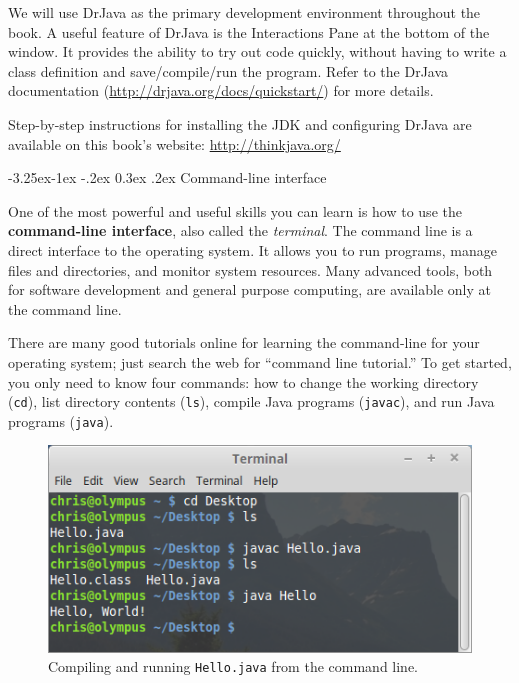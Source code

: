 \documentclass[12pt]{book}
\makeatletter
\theoremstyle{exercise}
\renewcommand\subsection{\@startsection{subsection}{2}{\z@}%
    {-3.25ex\@plus -1ex \@minus -.2ex}%
    {0.3ex \@plus .2ex}%
    {\normalfont\large\bfseries}}
\makeatother
\begin{document}

We will use DrJava as the primary development environment throughout the book.
A useful feature of DrJava is the Interactions Pane at the bottom of the window.
It provides the ability to try out code quickly, without having to write a class definition and save/compile/run the program.
Refer to the DrJava documentation (\url{http://drjava.org/docs/quickstart/}) for more details.

Step-by-step instructions for installing the JDK and configuring DrJava are available on this book's website: \url{http://thinkjava.org/}


\subsection{Command-line interface}


One of the most powerful and useful skills you can learn is how to use the {\bf command-line interface}, also called the {\em terminal}.
The command line is a direct interface to the operating system.
It allows you to run programs, manage files and directories, and monitor system resources.
Many advanced tools, both for software development and general purpose computing, are available only at the command line.

There are many good tutorials online for learning the command-line for your operating system; just search the web for ``command line tutorial.''
To get started, you only need to know four commands: how to change the working directory ({\tt cd}), list directory contents ({\tt ls}), compile Java programs ({\tt javac}), and run Java programs ({\tt java}).


\begin{figure}[!h]
\begin{center}
\includegraphics[width=4.5in]{figs/terminal.png}
\caption{Compiling and running {\tt Hello.java} from the command line.}
\end{center}
\end{figure}
\end{document}
